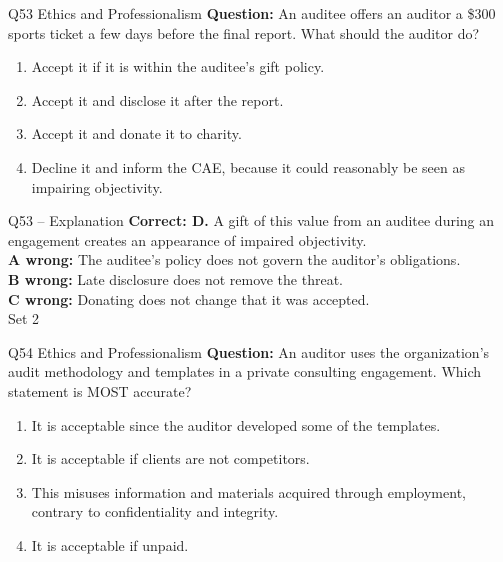 \documentclass[aspectratio=169,10pt]{beamer}
\begin{document}
\begin{frame}[t]{Q53 \hfill {\scriptsize Ethics and Professionalism}}
	\small
	\textbf{Question:} An auditee offers an auditor a \$300 sports ticket a few days before the final report. What should the auditor do?
	\begin{enumerate}[label=\Alph*.,itemsep=1pt,topsep=3pt]
			\item Accept it if it is within the auditee's gift policy.
			\item Accept it and disclose it after the report.
			\item Accept it and donate it to charity.
			\item Decline it and inform the CAE, because it could reasonably be seen as impairing objectivity.
	\end{enumerate}
\end{frame}

\begin{frame}[t]{Q53 -- Explanation}
	\footnotesize
	\textbf{Correct: D.} A gift of this value from an auditee during an engagement creates an appearance of impaired objectivity. \\[5pt]
\textbf{A wrong:} The auditee's policy does not govern the auditor's obligations. \\[3pt]
\textbf{B wrong:} Late disclosure does not remove the threat. \\[3pt]
\textbf{C wrong:} Donating does not change that it was accepted. \\[3pt]
	\vfill {\tiny Set 2}
\end{frame}

\begin{frame}[t]{Q54 \hfill {\scriptsize Ethics and Professionalism}}
	\small
	\textbf{Question:} An auditor uses the organization's audit methodology and templates in a private consulting engagement. Which statement is MOST accurate?
	\begin{enumerate}[label=\Alph*.,itemsep=1pt,topsep=3pt]
			\item It is acceptable since the auditor developed some of the templates.
			\item It is acceptable if clients are not competitors.
			\item This misuses information and materials acquired through employment, contrary to confidentiality and integrity.
			\item It is acceptable if unpaid.
	\end{enumerate}
\end{frame}
\end{document}
